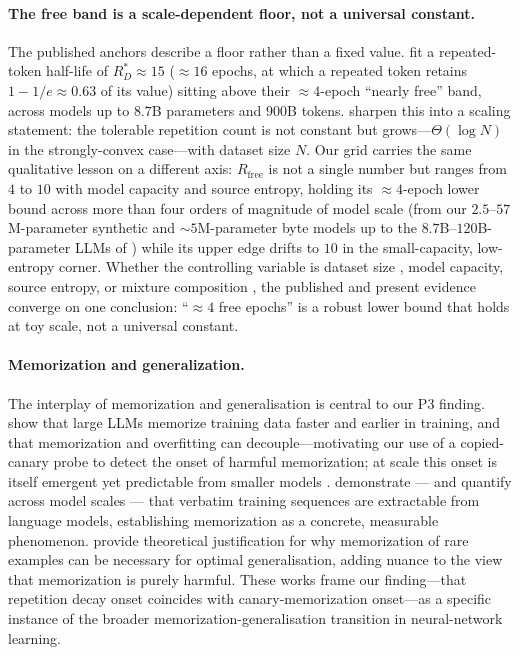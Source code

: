 \documentclass[11pt]{article}
\begin{document}
\paragraph{The free band is a scale-dependent floor, not a universal constant.}
The published anchors describe a floor rather than a fixed value.
\citet{muennighoff2023scaling} fit a repeated-token half-life of $R^{*}_{D}\approx15$
(${\approx}16$ epochs, at which a repeated token retains $1-1/e\approx0.63$ of its value)
sitting above their $\approx4$-epoch ``nearly free'' band, across models up to $8.7$B
parameters and $900$B tokens. \citet{yan2025repeatmore} sharpen this into a scaling
statement: the tolerable repetition count is not constant but grows---$\Theta(\log N)$ in the
strongly-convex case---with dataset size $N$. Our grid carries the same qualitative lesson on
a different axis: $R_{\mathrm{free}}$ is not a single number but ranges from $4$ to $10$ with
model capacity and source entropy, holding its $\approx4$-epoch lower bound across more than four
orders of magnitude of model scale (from our $2.5$--$57$M-parameter synthetic and
${\sim}5$M-parameter byte models up to the $8.7$B--$120$B-parameter LLMs of
\citet{muennighoff2023scaling,taylor2022galactica}) while its upper edge drifts to $10$ in the small-capacity,
low-entropy corner. Whether the controlling variable is dataset size
\citep{yan2025repeatmore}, model capacity, source entropy, or mixture composition
\citep{sedova2026mixture}, the published and present
evidence converge on one conclusion: ``${\approx}4$ free epochs'' is a robust
lower bound that holds at toy scale, not a universal constant.

\paragraph{Memorization and generalization.}
The interplay of memorization and generalisation is central to our P3 finding.
\citet{tirumala2022memorization} show that large LLMs memorize training data faster and
earlier in training, and that memorization and overfitting can decouple---motivating our
use of a copied-canary probe to detect the onset of harmful memorization; at scale this
onset is itself emergent yet predictable from smaller models \citep{biderman2023emergentmem}.
\citet{carlini2021extracting} demonstrate --- and \citet{carlini2023quantifying}
quantify across model scales --- that verbatim training sequences are extractable
from language models, establishing memorization as a concrete, measurable phenomenon.
\citet{feldman2020longtail} provide theoretical justification for why memorization of
rare examples can be necessary for optimal generalisation, adding nuance to the view that
memorization is purely harmful. These works frame our finding---that
repetition decay onset coincides with canary-memorization onset---as a specific instance
of the broader memorization-generalisation transition in neural-network learning.
\end{document}
